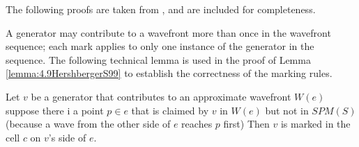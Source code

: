 The following proofs are taken from \cite{HershbergerS99}, and are included for completeness.

A generator may contribute to a wavefront more than once in the wavefront sequence; each mark 
applies to only one instance of the generator in the sequence. The following technical lemma 
is used in the proof of Lemma \ref{lemma:4.9HershbergerS99} to establish the correctness of 
the marking rules.

\begin{Lemma} \label{lemma:4.8HershbergerS99}
	Let $v$ be a generator that contributes to an approximate wavefront $W(e)$
	suppose there i a point $p \in e$ that is claimed by $v$ in $W(e)$ but not
	in $SPM(S)$ (because a wave from the other side of $e$ reaches $p$ first)
	Then $v$ is marked in the cell $c$ on $v$'s side of $e$.
\end{Lemma}
